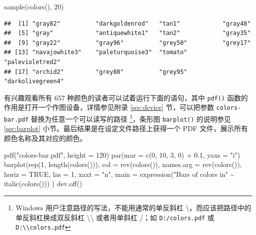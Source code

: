 \documentclass[
  b5paper,
  UTF8,twoside]{book}
\newenvironment{Shaded}{\begin{snugshade}}{\end{snugshade}}
\newcommand{\AttributeTok}[1]{\textcolor[rgb]{0.77,0.63,0.00}{#1}}
\newcommand{\ConstantTok}[1]{\textcolor[rgb]{0.00,0.00,0.00}{#1}}
\newcommand{\DecValTok}[1]{\textcolor[rgb]{0.00,0.00,0.81}{#1}}
\newcommand{\FloatTok}[1]{\textcolor[rgb]{0.00,0.00,0.81}{#1}}
\newcommand{\FunctionTok}[1]{\textcolor[rgb]{0.00,0.00,0.00}{#1}}
\newcommand{\NormalTok}[1]{#1}
\newcommand{\SpecialCharTok}[1]{\textcolor[rgb]{0.00,0.00,0.00}{#1}}
\newcommand{\StringTok}[1]{\textcolor[rgb]{0.31,0.60,0.02}{#1}}
\begin{document}
\begin{Shaded}
\begin{Highlighting}[]
\FunctionTok{sample}\NormalTok{(}\FunctionTok{colors}\NormalTok{(), }\DecValTok{20}\NormalTok{)}
\end{Highlighting}
\end{Shaded}

\begin{verbatim}
##  [1] "gray82"          "darkgoldenrod"   "tan1"            "gray48"         
##  [5] "gray"            "antiquewhite1"   "tan2"            "gray35"         
##  [9] "gray22"          "gray96"          "grey50"          "grey17"         
## [13] "navajowhite3"    "paleturquoise3"  "tomato"          "palevioletred2" 
## [17] "orchid2"         "grey88"          "grey95"          "darkolivegreen4"
\end{verbatim}

有兴趣观看所有 657 种颜色的读者可以试着运行下面的语句，其中 \texttt{pdf()} 函数的作用是打开一个作图设备，详情参见附录 \ref{sec:device} 节，可以把参数 \texttt{\textquotesingle{}colors-bar.pdf\textquotesingle{}} 替换为任意一个可以读写的路径 \footnote{Windows 用户注意路径的写法，不能用通常的单反斜杠 \textbackslash，而应该把路径中的单反斜杠换成双反斜杠 \textbackslash\textbackslash{} 或者用单斜杠 /；如 \texttt{D:/colors.pdf} 或 \texttt{D:\textbackslash{}\textbackslash{}colors.pdf}}，条形图 \texttt{barplot()} 的说明参见 \ref{sec:barplot} 小节。最后结果是在设定文件路径上获得一个 PDF 文件，展示所有颜色名称及其对应的颜色。

\begin{Shaded}
\begin{Highlighting}[]
\FunctionTok{pdf}\NormalTok{(}\StringTok{"colors{-}bar.pdf"}\NormalTok{, }\AttributeTok{height =} \DecValTok{120}\NormalTok{)}
\FunctionTok{par}\NormalTok{(}\AttributeTok{mar =} \FunctionTok{c}\NormalTok{(}\DecValTok{0}\NormalTok{, }\DecValTok{10}\NormalTok{, }\DecValTok{3}\NormalTok{, }\DecValTok{0}\NormalTok{) }\SpecialCharTok{+} \FloatTok{0.1}\NormalTok{, }\AttributeTok{yaxs =} \StringTok{"i"}\NormalTok{)}
\FunctionTok{barplot}\NormalTok{(}\FunctionTok{rep}\NormalTok{(}\DecValTok{1}\NormalTok{, }\FunctionTok{length}\NormalTok{(}\FunctionTok{colors}\NormalTok{())),}
  \AttributeTok{col =} \FunctionTok{rev}\NormalTok{(}\FunctionTok{colors}\NormalTok{()), }\AttributeTok{names.arg =} \FunctionTok{rev}\NormalTok{(}\FunctionTok{colors}\NormalTok{()), }\AttributeTok{horiz =} \ConstantTok{TRUE}\NormalTok{,}
  \AttributeTok{las =} \DecValTok{1}\NormalTok{, }\AttributeTok{xaxt =} \StringTok{"n"}\NormalTok{, }\AttributeTok{main =} \FunctionTok{expression}\NormalTok{(}\StringTok{"Bars of colors in"} \SpecialCharTok{\textasciitilde{}} \FunctionTok{italic}\NormalTok{(}\FunctionTok{colors}\NormalTok{()))}
\NormalTok{)}
\FunctionTok{dev.off}\NormalTok{()}
\end{Highlighting}
\end{Shaded}
\end{document}
